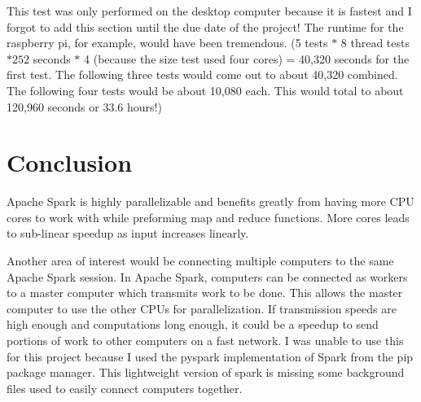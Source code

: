 \documentclass[12pt, letterpaper]{article}
\begin{document}
This test was only performed on the desktop computer because it is fastest and I forgot to add this section until the due date of the project! The runtime for the raspberry pi, for example, would have been tremendous. (5 tests $*$ 8 thread tests $* 252$ seconds $*$ 4 (because the size test used four cores) = 40,320 seconds for the first test. The following three tests would come out to about 40,320 combined. The following four tests would be about 10,080 each. This would total to about 120,960 seconds or 33.6 hours!)


\section{Conclusion}
Apache Spark is highly parallelizable and benefits greatly from having more CPU cores to work with while preforming map and reduce functions. More cores leads to sub-linear speedup as input increases linearly.

Another area of interest would be connecting multiple computers to the same Apache Spark session. In Apache Spark, computers can be connected as workers to a master computer which transmits work to be done. This allows the master computer to use the other CPUs for parallelization. If transmission speeds are high enough and computations long enough, it could be a speedup to send portions of work to other computers on a fast network. I was unable to use this for this project because I used the pyspark implementation of Spark from the pip package manager. This lightweight version of spark is missing some background files used to easily connect computers together.





\clearpage
\end{document}
